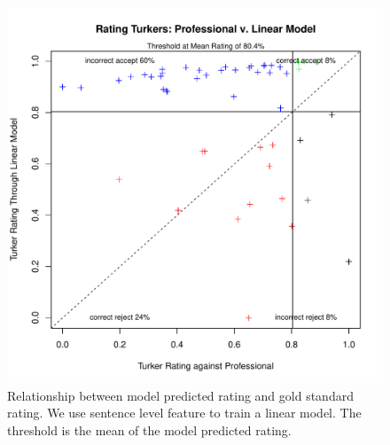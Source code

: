 \documentclass[11pt]{article}
\begin{document}
\begin{figure}[htbp]
  \centering
  \includegraphics[width=\linewidth]{Senfeature/rrankingsenfeatureranking}
  \caption{Relationship between model predicted rating and gold standard rating. We use sentence level feature to train a linear model. The threshold is the mean of the model predicted rating.}
    \label{flmsenrrating1}
\end{figure}
\end{document}
